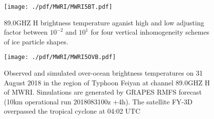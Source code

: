 \begin{figure}[hbtp] 
\centering
\texttt{[image: ./pdf/MWRI/MWRI5BT.pdf]}
\caption{89.0GHZ H brightness temperature aganist high and low adjusting factor between $10^{-2}$ and $10^{1}$ for four vertical 
inhomogeneity schemes of ice particle shapes.}
\label{fig:MWRI5BT}
\end{figure}

\begin{figure}[hbtp] 
\centering
\texttt{[image: ./pdf/MWRI/MWRI5OVB.pdf]}
\caption{Observed and simulated over-ocean brightness temperatures on 31 August 2018 in the region of Typhoon Feiyan at channel 89.0GHZ H of MWRI.
Simulations are generated by GRAPES RMFS forecast (10km operational run 2018083100z +4h). The satellite FY-3D overpassed the
tropical cyclone at 04:02 UTC}
\label{fig:MWRI5OVB}
\end{figure}

